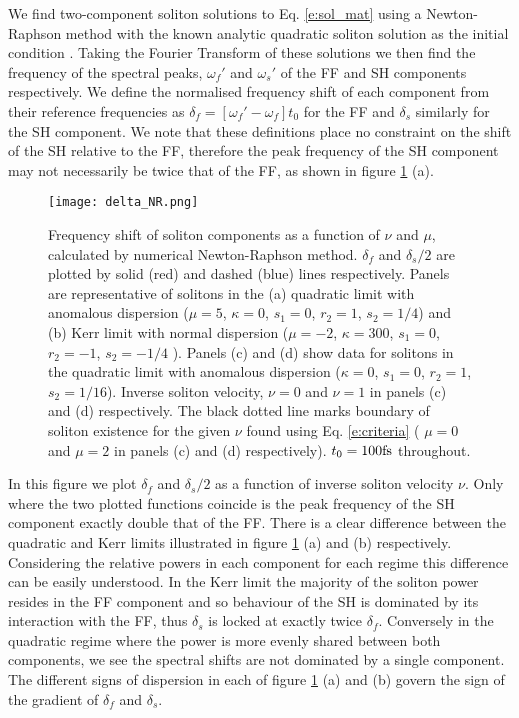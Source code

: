 \documentclass[reprint,
 amsmath,amssymb,
 pra,
]{revtex4-1}
\begin{document}
We find two-component soliton solutions to Eq. \eqref{e:sol_mat} using a Newton-Raphson method with the known analytic quadratic soliton solution as the initial condition \cite{Buryak2002}.
Taking the Fourier Transform of these solutions we then find the frequency of the spectral peaks, $\omega_f'$ and $\omega_s'$ of the FF and SH components respectively.
We define the normalised frequency shift of each component from their reference frequencies as $\delta_f = [\omega_f' - \omega_f]t_0$ for the FF and $\delta_s$ similarly for the SH component. We note that these definitions place no constraint on the shift of the SH relative to the FF, therefore the peak frequency of the SH component may not necessarily be twice that of the FF, as shown in figure \ref{fig:NR_freq_shift} (a).
\begin{figure}[b]
    \centering
    \texttt{[image: delta\_NR.png]}
    \caption{Frequency shift of soliton components as a function of $\nu$ and $\mu$, calculated by numerical Newton-Raphson method. $\delta_f$ and $\delta_s/2$ are plotted by solid (red) and dashed (blue) lines respectively. Panels are representative of solitons in the (a) quadratic limit with anomalous dispersion ($\mu=5$, $\kappa=0$, $s_1=0$, $r_2=1$, $s_2=1/4$) and (b) Kerr limit with normal dispersion ($\mu=-2$, $\kappa=300$, $s_1=0$, $r_2=-1$, $s_2=-1/4$ ). Panels (c) and (d) show data for solitons in the quadratic limit with anomalous dispersion ($\kappa=0$, $s_1=0$, $r_2=1$, $s_2=1/16$). Inverse soliton velocity, $\nu = 0$ and $\nu=1$ in panels (c) and (d) respectively. The black dotted line marks boundary of soliton existence for the given $\nu$ found using Eq. \eqref{e:criteria} ( $\mu = 0$ and $\mu = 2$ in panels (c) and (d) respectively). $t_0=100\rm{fs}$ throughout. }
    \label{fig:NR_freq_shift}
\end{figure}
In this figure we plot $\delta_f$ and $\delta_s/2$ as a function of inverse soliton velocity $\nu$. Only where the two plotted functions coincide is the peak frequency of the SH component exactly double that of the FF. There is a clear difference between the quadratic and Kerr limits illustrated in figure \ref{fig:NR_freq_shift} (a) and (b) respectively. Considering the relative powers in each component for each regime this difference can be easily understood. In the Kerr limit the majority of the soliton power resides in the FF component and so behaviour of the SH is dominated by its interaction with the FF, thus $\delta_s$ is locked at exactly twice $\delta_f$. Conversely in the quadratic regime where the power is more evenly shared between both components, we see the spectral shifts are not dominated by a single component. The different signs of dispersion in each of figure \ref{fig:NR_freq_shift} (a) and (b) govern the sign of the gradient of $\delta_f$ and $\delta_s$. 
\end{document}
